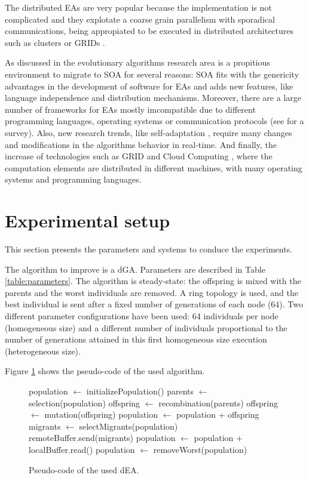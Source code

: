 The distributed EAs are very popular because the implementation is not complicated and they explotate a coarse grain parallelism with sporadical communications, being appropiated to be executed in distributed architectures such as clusters or GRIDs \cite{}.


As discussed in \cite{SOASOCO} the evolutionary algorithms research area is a propitious environment to migrate to SOA for several reasons: SOA fits with the genericity advantages in the development of software for EAs \citep{GENERICITY05} and adds new features, like language independence and  distribution mechanisms. Moreover, there are a large number of frameworks for EAs mostly imcompatible due to different programming languages, operating systems or communication protocols (see \cite{SURVEYMOFS} for a survey). Also, new research trends, like self-adaptation \citep{SELFSTAR}, require many changes and modifications in the algorithms behavior in real-time. And finally, the increase of technologies such as GRID and Cloud Computing \citep{CLOUD}, where the computation elements are distributed in different machines, with many operating systems and programming languages.




\section{Experimental setup}
\label{sec:experiments}
This section presents the parameters and systems to conduce the experiments.

The algorithm to improve is a dGA. Parameters are described in Table \ref{table:parameters}. The algorithm is steady-state: the offspring is mixed with the parents and the worst individuals are removed. A ring topology is used, and the best individual is sent after a fixed number of generations of each node (64).  Two different parameter configurations have been used: 64 individuals per node (homogeneous size) and a different number of individuals proportional to the number of generations attained in this first homogeneous size execution (heterogeneous size).

Figure \ref{fig:EA} shows the pseudo-code of the used algorithm.

\begin{figure}

\begin{algorithmic}
\STATE population $\gets$ initializePopulation()
    \STATE parents $\gets$ selection(population)
    \STATE offspring $\gets$ recombination(parents)
    \STATE offspring $\gets$ mutation(offspring)
    \STATE population $\gets$ population + offspring
      \STATE migrants $\gets$ selectMigrants(population)
      \STATE remoteBuffer.send(migrants)
    \ENDIF
      \STATE population $\gets$ population + localBuffer.read()
    \ENDIF
    \STATE population $\gets$ removeWorst(population)
\ENDWHILE

\end{algorithmic}
\caption{Pseudo-code of the used dEA.}
\label{fig:EA}
\end{figure}


